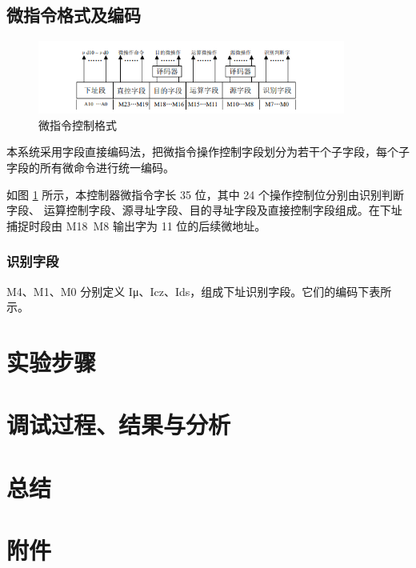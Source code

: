 \documentclass[a4paper,10pt,UTF8]{paper}
\numberwithin{equation}{section}
\numberwithin{figure}{section}
\begin{document}
\subsection{微指令格式及编码}

\begin{figure}[h]
	\centering
	\includegraphics[width=0.9\textwidth]{3.PNG}
	\caption{微指令控制格式}
	\label{fig:3}
\end{figure}


本系统采用字段直接编码法，把微指令操作控制字段划分为若干个子字段，每个子字段的所有微命令进行统一编码。

如图 \ref{fig:3} 所示，本控制器微指令字长 35 位，其中 24 个操作控制位分别由识别判断字段、
运算控制字段、源寻址字段、目的寻址字段及直接控制字段组成。在下址捕捉时段由 M18~M8
输出字为 11 位的后续微地址。

\subsubsection{识别字段}

M4、M1、M0 分别定义 Iμ、Icz、Ids，组成下址识别字段。它们的编码下表所示。
\section{实验步骤}

\section{调试过程、结果与分析}

\section{总结}

\section{附件}
\end{document}
